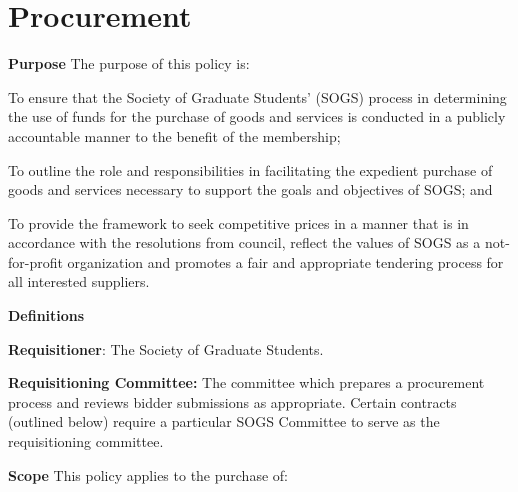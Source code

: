 \section{Procurement}
\begin{longenum}[label*=\thesection.\arabic*., align=left]
\item \textbf{Purpose} \newline
The purpose of this policy is:
\begin{longenum}[label*=\arabic*., align=left]
		 
\item To ensure that the Society of Graduate Students' (SOGS) process in determining the use of funds for the purchase of goods and services is conducted in a publicly accountable manner to the benefit of the membership;

\item To outline the role and responsibilities in facilitating the expedient purchase of goods and	services necessary to support the goals and objectives of SOGS; and

\item To provide the framework to seek competitive prices in a manner that is in accordance with the resolutions from council, reflect the values of SOGS as a not-for-profit organization and promotes a fair and	appropriate tendering process for all interested suppliers.


\end{longenum}

\item \textbf{Definitions}

\begin{longenum} [label*=\arabic*., align=left]
	
\item \textbf{Requisitioner}: The Society of Graduate Students.

\item \textbf{Requisitioning Committee:} The committee which prepares a procurement process and reviews bidder submissions as appropriate. Certain contracts (outlined below) require a particular SOGS Committee to serve as the requisitioning
	committee.
\end{longenum}

\item \textbf{Scope} \newline
This policy applies to the purchase of:
\begin{longenum} [label*=\arabic*., align=left]


\end{longenum}
\end{longenum}
